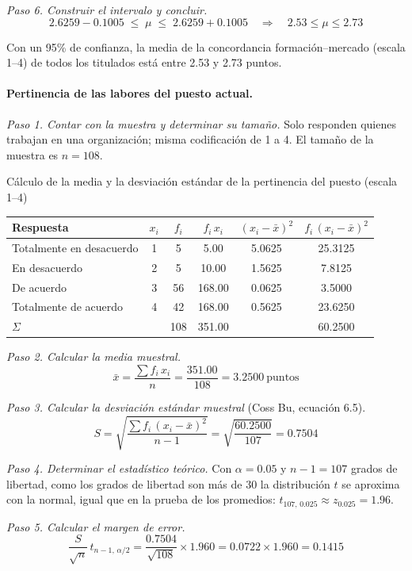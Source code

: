 \textit{Paso 6. Construir el intervalo y concluir.}
\[
2.6259 - 0.1005 \;\le\; \mu \;\le\; 2.6259 + 0.1005 \quad\Longrightarrow\quad 2.53 \le \mu \le 2.73
\]

Con un 95\% de confianza, la media de la concordancia formación--mercado (escala 1--4) de todos los titulados está entre 2.53 y 2.73 puntos.

\paragraph{Pertinencia de las labores del puesto actual.}

\textit{Paso 1. Contar con la muestra y determinar su tamaño.} Solo responden quienes trabajan en una organización; misma codificación de 1 a 4. El tamaño de la muestra es $n = 108$.

\begin{mitabla}{Cálculo de la media y la desviación estándar de la pertinencia del puesto (escala 1--4)}
\begin{tabular}{lccccc}
\toprule
Respuesta & $x_i$ & $f_i$ & $f_i\,x_i$ & $(x_i-\bar{x})^2$ & $f_i\,(x_i-\bar{x})^2$ \\
\midrule
Totalmente en desacuerdo & 1 & 5 & 5.00 & 5.0625 & 25.3125 \\
En desacuerdo & 2 & 5 & 10.00 & 1.5625 & 7.8125 \\
De acuerdo & 3 & 56 & 168.00 & 0.0625 & 3.5000 \\
Totalmente de acuerdo & 4 & 42 & 168.00 & 0.5625 & 23.6250 \\
\midrule
$\Sigma$ & & 108 & 351.00 & & 60.2500 \\
\bottomrule
\end{tabular}
\end{mitabla}

\textit{Paso 2. Calcular la media muestral.}
\[
\bar{x} = \frac{\sum f_i\,x_i}{n} = \frac{351.00}{108} = 3.2500\ \text{puntos}
\]

\textit{Paso 3. Calcular la desviación estándar muestral} (Coss Bu, ecuación 6.5).
\[
S = \sqrt{\frac{\sum f_i\,(x_i-\bar{x})^2}{n-1}} = \sqrt{\frac{60.2500}{107}} = 0.7504
\]

\textit{Paso 4. Determinar el estadístico teórico.} Con $\alpha = 0.05$ y $n-1 = 107$ grados de libertad, como los grados de libertad son más de 30 la distribución $t$ se aproxima con la normal, igual que en la prueba de los promedios: $t_{107,\,0.025} \approx z_{0.025} = 1.96$.

\textit{Paso 5. Calcular el margen de error.}
\[
\frac{S}{\sqrt{n}}\,t_{n-1,\,\alpha/2} = \frac{0.7504}{\sqrt{108}}\times 1.960 = 0.0722 \times 1.960 = 0.1415
\]

